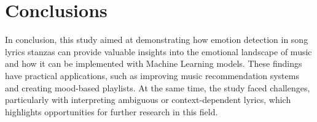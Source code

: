 \chapter*{Conclusions}
\label{ch:conclusions}


In conclusion, this study aimed at demonstrating how emotion detection in song
lyrics stanzas can provide valuable insights into the emotional landscape of
music and how it can be implemented with Machine Learning models. 
These findings have practical applications, such as improving music
recommendation systems and creating mood-based playlists. 
At the same time, the study faced challenges, particularly with interpreting
ambiguous or context-dependent lyrics, which highlights opportunities for further
research in this field.



